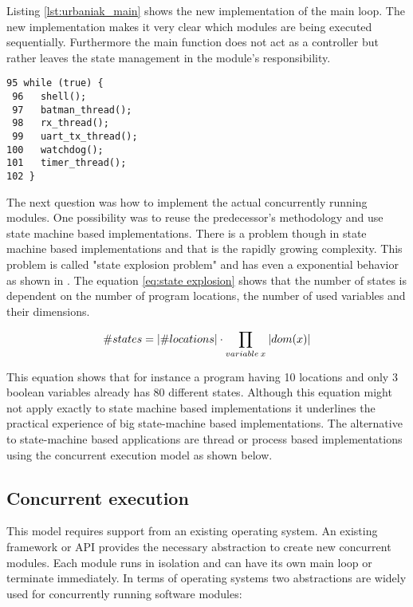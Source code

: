 Listing \ref{lst:urbaniak_main} shows the new implementation of the main loop. The new implementation makes it very clear which modules are being executed sequentially. Furthermore the main function does not act as a controller but rather leaves the state management in the module's responsibility.

\begin{lstlisting}[label=lst:urbaniak_main,caption=main function implementation]
 95 while (true) {
 96   shell();
 97   batman_thread();
 98   rx_thread();
 99   uart_tx_thread();
100   watchdog();
101   timer_thread();
102 }
\end{lstlisting}

The next question was how to implement the actual concurrently running modules. One possibility was to reuse the predecessor's methodology and use state machine based implementations. There is a problem though in state machine based implementations and that is the rapidly growing complexity. This problem is called "state explosion problem" and has even a exponential behavior as shown in \cite{katoen}. The equation \ref{eq:state explosion} shows that the number of states is dependent on the number of program locations, the number of used variables and their dimensions.

\begin{equation}
\label{eq:state explosion}
\#states = \lvert\#locations\rvert \cdot \prod_{variable \: x} \: \lvert dom(x)\rvert
\end{equation}

This equation shows that for instance a program having 10 locations and only 3 boolean variables already has 80 different states. Although this equation might not apply exactly to state machine based implementations it underlines the practical experience of big state-machine based implementations. The alternative to state-machine based applications are thread or process based implementations using the concurrent execution model as shown below.

\subsection{Concurrent execution}
This model requires support from an existing operating system. An existing framework or API provides the necessary abstraction to create new concurrent modules. Each module runs in isolation and can have its own main loop or terminate immediately. In terms of operating systems two abstractions are widely used for concurrently running software modules:

